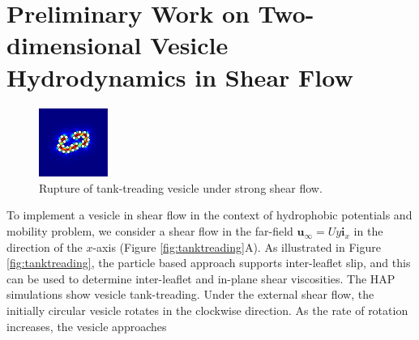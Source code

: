 \section{Preliminary Work on Two-dimensional Vesicle Hydrodynamics in Shear Flow} 
%
%
\begin{figure}
\centerline{\includegraphics[width=0.2\textwidth]{figures/PW_fig5.pdf}}
\vspace{-8pt}
\caption{\label{fig:rupture} \footnotesize Rupture of tank-treading vesicle under strong shear flow.}
\end{figure}
%
To implement a vesicle in shear flow in the context of hydrophobic
potentials and mobility problem, we consider a shear flow in the
far-field $\mathbf{u}_{\infty} = Uy\mathbf{i}_x$ in the direction of the
$x$-axis (Figure \ref{fig:tanktreading}A). As illustrated in Figure
\ref{fig:tanktreading}, the particle based approach supports
inter-leaflet slip, and this can be used to determine inter-leaflet and
in-plane shear viscosities. 
%
%
The HAP simulations show vesicle tank-treading. Under the external shear flow, the initially circular 
vesicle rotates in the clockwise direction. As the rate of rotation increases, the vesicle approaches
